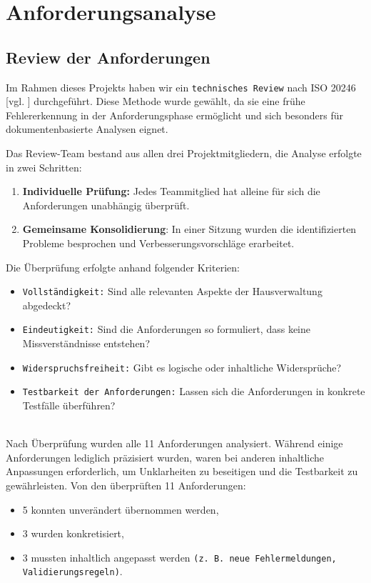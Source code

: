 \newpage


\section{Anforderungsanalyse}\label{sec:anforderungsanalyse}

\subsection{Review der Anforderungen}\label{subsec:review-der-anforderungen}


Im Rahmen dieses Projekts haben wir ein \texttt{technisches Review} nach ISO 20246 [vgl. \cite{Technical-Committee}] durchgeführt.
Diese Methode wurde gewählt, da sie eine frühe Fehlererkennung in der Anforderungsphase ermöglicht und sich besonders für dokumentenbasierte Analysen eignet.

Das Review-Team bestand aus allen drei Projektmitgliedern, die Analyse erfolgte in zwei Schritten:
\begin{enumerate}
    \item \textbf{Individuelle Prüfung:} Jedes Teammitglied hat alleine für sich die Anforderungen unabhängig überprüft.
    \item \textbf{Gemeinsame Konsolidierung}: In einer Sitzung wurden die identifizierten Probleme besprochen und Verbesserungsvorschläge erarbeitet.
\end{enumerate}

Die Überprüfung erfolgte anhand folgender Kriterien:
\begin{itemize}[noitemsep, topsep=0pt, parsep=0pt, partopsep=0pt]
    \item \texttt{Vollständigkeit:} Sind alle relevanten Aspekte der Hausverwaltung abgedeckt?
    \item \texttt{Eindeutigkeit:} Sind die Anforderungen so formuliert, dass keine Missverständnisse entstehen?
    \item \texttt{Widerspruchsfreiheit:} Gibt es logische oder inhaltliche Widersprüche?
    \item \texttt{Testbarkeit der Anforderungen:} Lassen sich die Anforderungen in konkrete Testfälle überführen?
\end{itemize}
\\
Nach Überprüfung wurden alle 11 Anforderungen analysiert.
Während einige Anforderungen lediglich präzisiert wurden, waren bei anderen inhaltliche Anpassungen erforderlich, um Unklarheiten zu beseitigen und die Testbarkeit zu gewährleisten.
Von den überprüften 11 Anforderungen:
\begin{itemize}
    \item 5 konnten unverändert übernommen werden,
    \item 3 wurden konkretisiert,
    \item 3 mussten inhaltlich angepasst werden \texttt{(z. B. neue Fehlermeldungen, Validierungsregeln)}.
\end{itemize}

